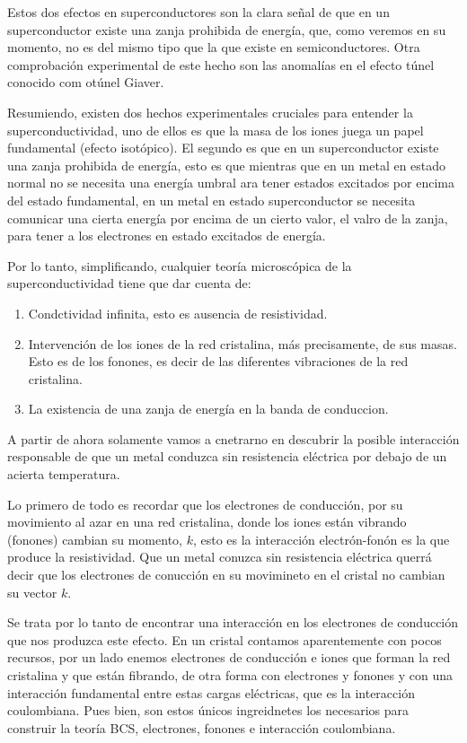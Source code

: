 Estos dos efectos en superconductores son la clara señal de que en un superconductor existe una zanja prohibida de energía, que, como veremos en su momento, no es del mismo tipo que la que existe en semiconductores. Otra comprobación experimental de este hecho son las anomalías en el efecto túnel conocido com otúnel Giaver.

Resumiendo, existen dos hechos experimentales cruciales para entender la superconductividad, uno de ellos es que la masa de los iones juega un papel fundamental (efecto isotópico). El segundo es que en un superconductor existe una zanja prohibida de energía, esto es que mientras que en un metal en estado normal no se necesita una energía umbral ara tener estados excitados por encima del estado fundamental, en un metal en estado superconductor se necesita comunicar una cierta energía por encima de un cierto valor, el valro de la zanja, para tener a los electrones en estado excitados de energía.

Por lo tanto, simplificando, cualquier teoría microscópica de la superconductividad tiene que dar cuenta de:

\begin{enumerate}
    \item Condctividad infinita, esto es ausencia de resistividad.
    \item Intervención de los iones de la red cristalina, más precisamente, de sus masas. Esto es de los fonones, es decir de las diferentes vibraciones de la red cristalina.
    \item La existencia de una zanja de energía en la banda de conduccion.
\end{enumerate}

A partir de ahora solamente vamos a cnetrarno en descubrir la posible interacción responsable de que un metal conduzca sin resistencia eléctrica por debajo de un acierta temperatura.

Lo primero de todo es recordar que los electrones de conducción, por su movimiento al azar en una red cristalina, donde los iones están vibrando (fonones) cambian su momento, $k$, esto es la interacción electrón-fonón es la que produce la resistividad. Que un metal conuzca sin resistencia eléctrica querrá decir que los electrones de conucción en su movimineto en el cristal no cambian su vector $k$.

Se trata por lo tanto de encontrar una interacción en los electrones de conducción que nos produzca este efecto. En un cristal contamos aparentemente con pocos recursos, por un lado enemos electrones de conducción e iones que forman la red cristalina y que están fibrando, de otra forma con electrones y fonones y con una interacción fundamental entre estas cargas eléctricas, que es la interacción coulombiana. Pues bien, son estos únicos ingreidnetes los necesarios para construir la teoría BCS, electrones, fonones e interacción coulombiana.

